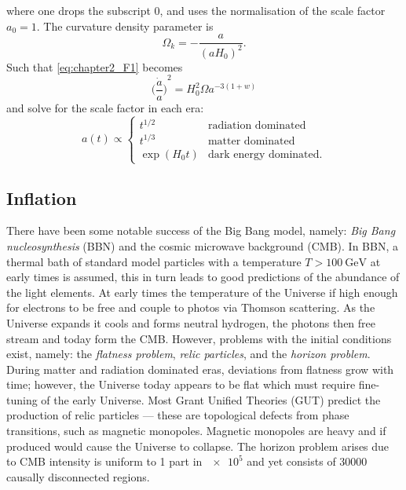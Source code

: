 %
where one drops the subscript \(0\), and uses the normalisation of the scale factor \(a_{0}=1\).
The curvature density parameter is
%
\begin{equation}
	\Omega_{k}
	= -\frac{a}{{(aH_{0})}^{2}}.
\end{equation}
%
Such that \cref{eq:chapter2_F1} becomes
%
\begin{equation}
	{\bigg(\frac{\dot{a}}{a}\bigg)}^{2}
	= H_{0}^{2} \Omega a^{-3(1+w)}
\end{equation}
%
and solve for the scale factor in each era:
%
\begin{equation}
	a(t) \propto
	\begin{cases}
		t^{1/2}      & \text{radiation dominated}    \\
		t^{1/3}      & \text{matter dominated}       \\
		\exp(H_{0}t) & \text{dark energy dominated}.
	\end{cases}
\end{equation}

\subsection{Inflation}\label{sec:chapter2_inflation}

There have been some notable success of the Big Bang model, namely: \emph{Big Bang nucleosynthesis} (BBN) and the cosmic microwave background (CMB).
In BBN, a thermal bath of standard model particles with a temperature \(T > \SI{100}{\giga\eV}\) at early times is assumed, this in turn leads to good predictions of the abundance of the light elements.
At early times the temperature of the Universe if high enough for electrons to be free and couple to photos via Thomson scattering.
As the Universe expands it cools and forms neutral hydrogen, the photons then free stream and today form the CMB\@.
However, problems with the initial conditions exist, namely: the \emph{flatness problem}, \emph{relic particles}, and the \emph{horizon problem}.
During matter and radiation dominated eras, deviations from flatness grow with time; however, the Universe today appears to be flat which must require fine-tuning of the early Universe.
Most Grant Unified Theories (GUT) predict the production of relic particles --- these are topological defects from phase transitions, such as magnetic monopoles.
Magnetic monopoles are heavy and if produced would cause the Universe to collapse.
The horizon problem arises due to CMB intensity is uniform to 1 part in \(\num{e5}\) and yet consists of \(\num{30000}\) causally disconnected regions.


